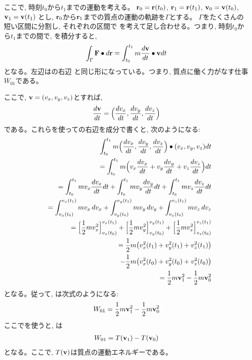 ここで, 時刻$t_0$から$t_1$までの運動を考える。
${\bf r}_0={\bf r}(t_0)$, 
${\bf r}_1={\bf r}(t_1)$, 
${\bf v}_0={\bf v}(t_0)$, 
${\bf v}_1={\bf v}(t_1)$
とし, ${\bf r}_0$から${\bf r}_1$までの質点の運動の軌跡を$\Gamma$とする。
$\Gamma$をたくさんの短い区間に分割し, それぞれの区間で
を考えて足し合わせる。つまり, 時刻$t_0$から$t_1$までの間で, 
を積分すると, 
\begin{eqnarray}
\int_{\Gamma}{\bf F}\bullet d{\bf r}=\int_{t_0}^{t_1}m\frac{d{\bf v}}{dt}\bullet {\bf v}dt\label{eq:3D_WandT00s}
\end{eqnarray}
となる。左辺はの右辺
と同じ形になっている。つまり, 質点に働く力がなす仕事$W_{01}$である。

ここで, ${\bf v}=(v_x, v_y, v_z)$とすれば, 
\begin{eqnarray}
\frac{d{\bf v}}{dt}=\Bigl(\frac{dv_x}{dt}, \frac{dv_y}{dt}, \frac{dv_z}{dt}\Bigr)
\end{eqnarray}
である。これらを使っての右辺を成分で書くと, 次のようになる:
\begin{eqnarray}
&&\int_{t_0}^{t_1}m\Bigl(\frac{dv_x}{dt}, \frac{dv_y}{dt}, \frac{dv_z}{dt}\Bigr)\bullet(v_x, v_y, v_z)dt\\
&&=\int_{t_0}^{t_1}m\Bigl(v_x\frac{dv_x}{dt}+v_y\frac{dv_y}{dt}+v_z\frac{dv_z}{dt}\Bigr)dt\\
&&=\int_{t_0}^{t_1}mv_x\frac{dv_x}{dt}dt+\int_{t_0}^{t_1}mv_y\frac{dv_y}{dt}dt+\int_{t_0}^{t_1}mv_z\frac{dv_z}{dt}dt\nonumber\\
&&=\int_{v_x(t_0)}^{v_x(t_1)}mv_x\,dv_x+\int_{v_y(t_0)}^{v_y(t_1)}mv_y\,dv_y+\int_{v_z(t_0)}^{v_z(t_1)}mv_z\,dv_z\nonumber\\
&&=\Bigl[\frac{1}{2}m v_x^2\Bigr]_{v_x(t_0)}^{v_x(t_1)}+\Bigl[\frac{1}{2}m v_y^2\Bigr]_{v_y(t_0)}^{v_y(t_1)}+\Bigl[\frac{1}{2}m v_z^2\Bigr]_{v_z(t_0)}^{v_z(t_1)}\nonumber\\
&&=\frac{1}{2}m\bigl(v_x^2(t_1)+v_y^2(t_1)+v_z^2(t_1)\bigr)\nonumber\\
&&\,\,\,\,-\frac{1}{2}m\bigl(v_x^2(t_0)+v_y^2(t_0)+v_z^2(t_0)\bigr)\\
&&=\frac{1}{2}m{\bf v}_1^2-\frac{1}{2}m{\bf v}_0^2
\end{eqnarray}
となる。従って, は次式のようになる:
\begin{eqnarray}
W_{01}=\frac{1}{2}m{\bf v}_1^2-\frac{1}{2}m{\bf v}_0^2\label{eq:3DWandT0}
\end{eqnarray}
ここでを使うと, は
\begin{eqnarray}
W_{01}=T({\bf v}_1)-T({\bf v}_0)\label{eq:3D_WandT2}
\end{eqnarray}
となる。ここで, $T({\bf v})$は質点の運動エネルギーである。


